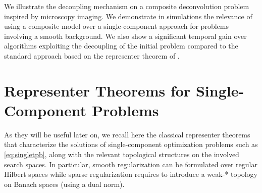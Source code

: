 \documentclass[12pt]{article}
\begin{document}

    We illustrate the decoupling mechanism on a composite deconvolution problem inspired by microscopy imaging.
    We demonstrate in simulations the relevance of using a composite model over a single-component approach for problems involving a smooth background. We also show a significant temporal gain over algorithms exploiting the decoupling of the initial problem compared to the standard approach based on the representer theorem of \cite{debarre2021continuous}. 




\section{Representer Theorems for Single-Component Problems}

    As they will be useful later on, we recall here the classical representer theorems that characterize the solutions of single-component optimization problems such as \eqref{eq:singletpb}, along with the relevant topological structures on the involved search spaces. In particular, smooth regularization can be formulated over regular Hilbert spaces while
    sparse regularization requires to introduce a weak-* topology on Banach spaces (using a dual norm).

    
\end{document}
